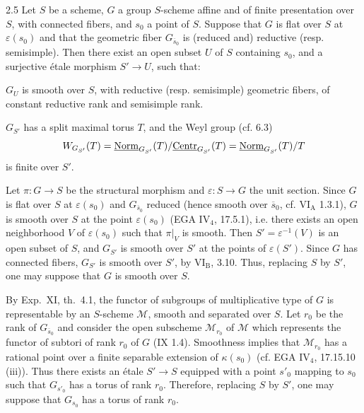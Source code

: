 \begin{theorem}{2.5}\label{XIX.2.5}
Let $S$ be a scheme, $G$ a group $S$-scheme affine and of finite presentation over $S$, with connected fibers, and $s_0$ a point of $S$. Suppose that $G$ is flat over $S$ at $\varepsilon(s_0)$ and that the geometric fiber $G_{\overline{s}_0}$ is (reduced and) reductive (resp. semisimple). Then there exist an open subset $U$ of $S$ containing $s_0$, and a surjective \'etale morphism $S'\to U$, such that:
\begin{enumeratei}
\item $G_U$ is smooth over $S$, with reductive (resp. semisimple) geometric fibers, of constant reductive rank and semisimple rank.
\item $G_{S'}$ has a split maximal torus{\renewcommand{\thefootnote}{(20)}} $T$, and the Weyl group (cf. 6.3)
\[
W_{G_{S'}}(T)=\underline{\mathrm{Norm}}_{G_{S'}}(T)/\underline{\mathrm{Centr}}_{G_{S'}}(T)=\underline{\mathrm{Norm}}_{G_{S'}}(T)/T
\]
is finite over $S'$.
\end{enumeratei}
\end{theorem}
{\renewcommand{\thefootnote}{(21)}}%
Let $\pi:G\to S$ be the structural morphism and $\varepsilon:S\to G$ the unit section. Since $G$ is flat over $S$ at $\varepsilon(s_0)$ and $G_{\overline{s}_0}$ reduced (hence smooth over $\overline{s}_0$, cf. VI$_{\mathrm A}$ 1.3.1), $G$ is smooth over $S$ at the point $\varepsilon(s_0)$ (EGA IV$_4$, 17.5.1), i.e. there exists an open neighborhood $V$ of $\varepsilon(s_0)$ such that $\pi|_V$ is smooth. Then $S'=\varepsilon^{-1}(V)$ is an open subset of $S$, and $G_{S'}$ is smooth over $S'$ at the points of $\varepsilon(S')$. Since $G$ has connected fibers, $G_{S'}$ is smooth over $S'$, by VI$_{\mathrm B}$, 3.10. Thus, replacing $S$ by $S'$, one may suppose that $G$ is smooth over $S$.

By Exp.~XI, th.~4.1, the functor of subgroups of multiplicative type of $G$ is representable by an $S$-scheme $\mathcal M$, smooth and separated over $S$. Let $r_0$ be the rank of $G_{\overline{s}_0}$ and consider the open subscheme $\mathcal M_{r_0}$ of $\mathcal M$ which represents the functor of subtori of rank $r_0$ of $G$ (IX 1.4). Smoothness implies that $\mathcal M_{r_0}$ has a rational point over a finite separable extension of $\kappa(s_0)$ (cf. EGA IV$_4$, 17.15.10 (iii)). Thus there exists an \'etale $S'\to S$ equipped with a point $s'_0$ mapping to $s_0$ such that $G_{s'_0}$ has a torus of rank $r_0$. Therefore, replacing $S$ by $S'$, one may suppose that $G_{s_0}$ has a torus of rank $r_0$.


